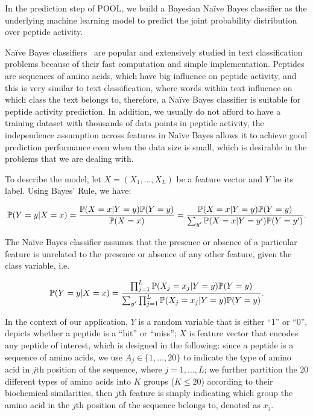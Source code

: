 In the prediction step of POOL, we build a Bayesian Na{\"i}ve Bayes classifier as the underlying machine learning model to predict the joint probability distribution over peptide activity.

Na{\"i}ve Bayes classifiers~\cite{lewis1994sequential, mccallum1998comparison} are popular and extensively studied in text classification problems because of their fast computation and simple implementation.
Peptides are sequences of amino acids, which have big influence on peptide activity, and this is very similar to text classification, where words within text influence on which class the text belongs to, therefore, a Na{\"i}ve Bayes classifier is suitable for peptide activity prediction. 
In addition, we usually do not afford to have a training dataset with thousands of data points in peptide activity, the independence assumption across features in Na{\"i}ve Bayes allows it to achieve good prediction performance even when the data size is small, which is desirable in the problems that we are dealing with.

To describe the model, let $X=(X_1,\ldots,X_L)$ be a feature vector and $Y$ be its label. Using Bayes' Rule, we have:

\begin{equation*}
\mathbb{P}(Y=y|X=x)=\frac{\mathbb{P}(X=x|Y=y)\mathbb{P}(Y=y)}{\mathbb{P}(X=x)}=\frac{\mathbb{P}(X=x|Y=y)\mathbb{P}(Y=y)}{\sum_{y'}\mathbb{P}(X=x|Y=y')\mathbb{P}(Y=y')}.
\end{equation*}

The Na{\"i}ve Bayes classifier assumes that the presence or absence of a particular feature is unrelated to the presence or absence of any other feature, given the class variable, i.e.

\begin{equation*}
\mathbb{P}(Y=y|X=x) = \frac{\prod_{j=1}^L\mathbb{P}(X_j=x_j|Y=y)\mathbb{P}(Y=y)}{\sum_{y'}\prod_{j=1}^L\mathbb{P}(X_j=x_j|Y=y)\mathbb{P}(Y=y)}.
\end{equation*}

In the context of our application, $Y$ is a random variable that is either ``1'' or ``0'', depicts whether a peptide is a ``hit'' or ``miss''; $X$ is feature vector
that encodes any peptide of interest, which is designed in the following: since a peptide is a sequence of amino acids, we use $A_j \in \{1, \ldots, 20\}$ to indicate 
the type of amino acid in $j$th position of the sequence, where $j=1,\ldots,L$; we further partition the 20 different types of amino acids into $K$ groups ($K \leq 20$)
according to their biochemical similarities, then $j$th feature is simply indicating which group the amino acid in the $j$th position of the sequence belongs to, denoted
as $x_j$.

